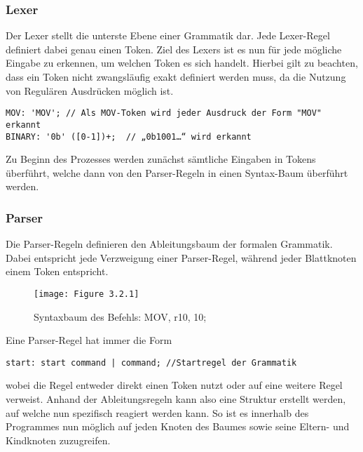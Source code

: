 \documentclass[paper=a4,fontsize=12pt]{scrreprt}
\begin{document}
\subsubsection{Lexer}
Der Lexer stellt die unterste Ebene einer Grammatik dar. Jede Lexer-Regel definiert dabei genau einen Token. Ziel des Lexers ist es nun für jede mögliche Eingabe zu erkennen, um welchen Token es sich handelt. Hierbei gilt zu beachten, dass ein Token nicht zwangsläufig exakt definiert werden muss, da die Nutzung von Regulären Ausdrücken möglich ist.
\begin{lstlisting}
MOV: 'MOV'; // Als MOV-Token wird jeder Ausdruck der Form "MOV" erkannt
BINARY: '0b' ([0-1])+;  // „0b1001…“ wird erkannt
\end{lstlisting}
Zu Beginn des Prozesses werden zunächst sämtliche Eingaben in Tokens überführt, welche dann von den Parser-Regeln in einen Syntax-Baum überführt werden. 

\subsubsection{Parser}
Die Parser-Regeln definieren den Ableitungsbaum der formalen Grammatik. Dabei entspricht jede Verzweigung einer Parser-Regel, während jeder Blattknoten einem Token entspricht. 

\begin{figure}[h]
\centering
\texttt{[image: Figure 3.2.1]}
\caption{Syntaxbaum des Befehls: MOV, r10, 10;}
\end{figure}

Eine Parser-Regel hat immer die Form
\begin{lstlisting}
start: start command | command; //Startregel der Grammatik
\end{lstlisting}
wobei die Regel entweder direkt einen Token nutzt oder auf eine weitere Regel verweist. 
Anhand der Ableitungsregeln kann also eine Struktur erstellt werden, auf welche nun spezifisch reagiert werden kann. So ist es innerhalb des Programmes nun möglich auf jeden Knoten des Baumes sowie seine Eltern- und Kindknoten zuzugreifen. 
\end{document}
